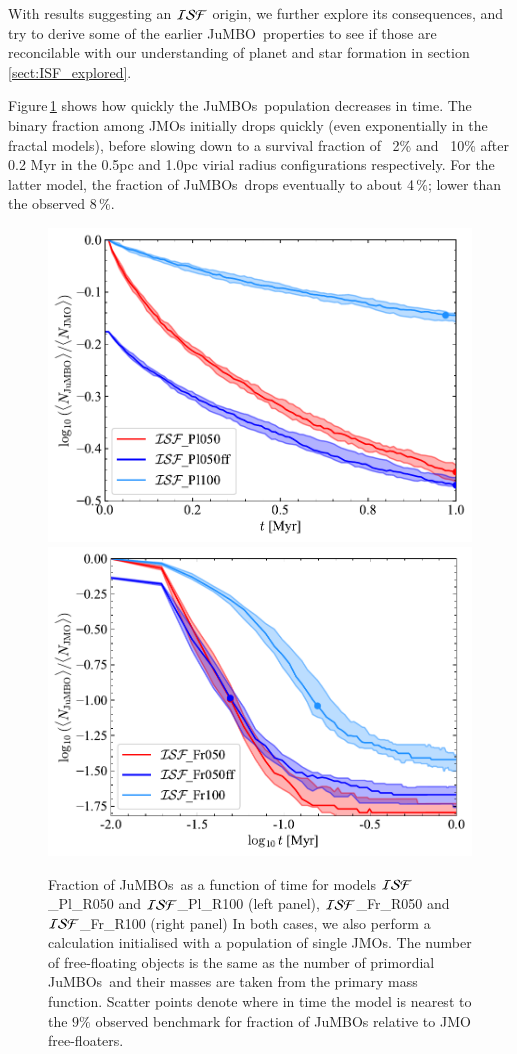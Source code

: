 \documentclass[submission,phys]{lib/SciPost}
\newcommand{\jumbo}{\mbox{JuMBO}}
\newcommand{\jumbos}{\mbox{JuMBOs}}
\begin{document}
With results suggesting an ${\cal ISF}$ origin, we further
explore its consequences, and try to derive some of the earlier
\jumbo\, properties to see if those are reconcilable with our
understanding of planet and star formation in
section\,\ref{sect:ISF_explored}.

Figure\,\ref{Fig:Fjumbo_vs_time_model_ISF_Fr} shows how quickly the
\jumbos\, population decreases in time. The binary
fraction among JMOs initially drops quickly (even
exponentially in the fractal models), before slowing down to a survival 
fraction of ~2\% and ~10\% after 0.2 Myr in the 0.5pc and 1.0pc virial 
radius configurations respectively. For the latter model, the fraction of 
\jumbos\, drops eventually to about 4\,\%; lower than the observed 8\,\%.

\begin{figure}
    \centering
    \includegraphics[width=0.49\columnwidth]{figures/Plummer_General_fJuMBO_evol.pdf}
    \includegraphics[width=0.49\columnwidth]{figures/Fractal_General_fJuMBO_evol.pdf}
    \caption{Fraction of \jumbos\ as a function of time for models
      ${\cal ISF}$\_Pl\_R050 and ${\cal ISF}$\_Pl\_R100 (left panel),
      ${\cal ISF}$\_Fr\_R050 and ${\cal ISF}$\_Fr\_R100 (right panel)
      In both cases, we also perform a calculation initialised with a
      population of single JMOs. The number of free-floating objects
      is the same as the number of primordial \jumbos\, and their
      masses are taken from the primary mass function. Scatter points
      denote where in time the model is nearest to the $9\%$ observed
      benchmark for fraction of JuMBOs relative to JMO free-floaters.
    }
        \label{Fig:Fjumbo_vs_time_model_ISF_Pl}
        \label{Fig:Fjumbo_vs_time_model_ISF_Fr}
\end{figure}
\end{document}
